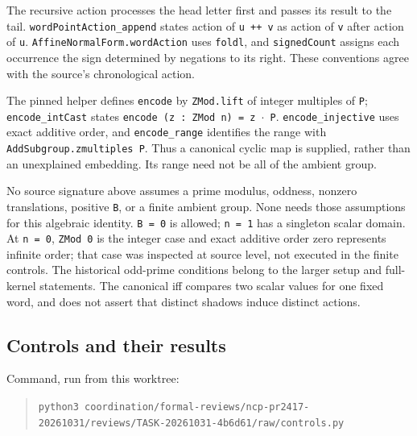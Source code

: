\documentclass[10pt]{article}
\begin{document}
The recursive action processes the head letter first and passes its result to the tail. \texttt{wordPointAction\allowbreak{}\_\allowbreak{}append} states action of \texttt{u ++ v} as action of \texttt{v} after action of \texttt{u}. \texttt{AffineNormalForm\allowbreak{}.\allowbreak{}wordAction} uses \texttt{foldl}, and \texttt{signedCount} assigns each occurrence the sign determined by negations to its right. These conventions agree with the source's chronological action.


The pinned helper defines \texttt{encode} by \texttt{ZMod\allowbreak{}.\allowbreak{}lift} of integer multiples of \texttt{P}; \texttt{encode\allowbreak{}\_\allowbreak{}intCast} states \texttt{encode (z : ZMod n) = z $\cdot$ P}. \texttt{encode\allowbreak{}\_\allowbreak{}injective} uses exact additive order, and \texttt{encode\allowbreak{}\_\allowbreak{}range} identifies the range with \texttt{AddSubgroup\allowbreak{}.\allowbreak{}zmultiples P}. Thus a canonical cyclic map is supplied, rather than an unexplained embedding. Its range need not be all of the ambient group.


No source signature above assumes a prime modulus, oddness, nonzero translations, positive \texttt{B}, or a finite ambient group. None needs those assumptions for this algebraic identity. \texttt{B = 0} is allowed; \texttt{n = 1} has a singleton scalar domain. At \texttt{n = 0}, \texttt{ZMod 0} is the integer case and exact additive order zero represents infinite order; that case was inspected at source level, not executed in the finite controls. The historical odd-prime conditions belong to the larger setup and full-kernel statements. The canonical iff compares two scalar values for one fixed word, and does not assert that distinct shadows induce distinct actions.


\subsection*{Controls and their results}


Command, run from this worktree:


\begin{quote}\small \texttt{python3 coordination\allowbreak{}/\allowbreak{}formal\allowbreak{}-\allowbreak{}reviews\allowbreak{}/\allowbreak{}ncp\allowbreak{}-\allowbreak{}pr2417\allowbreak{}-\allowbreak{}20261031\allowbreak{}/\allowbreak{}reviews\allowbreak{}/\allowbreak{}TASK\allowbreak{}-\allowbreak{}20261031\allowbreak{}-\allowbreak{}4b6d61\allowbreak{}/\allowbreak{}raw\allowbreak{}/\allowbreak{}controls\allowbreak{}.\allowbreak{}py}\end{quote}
\end{document}

